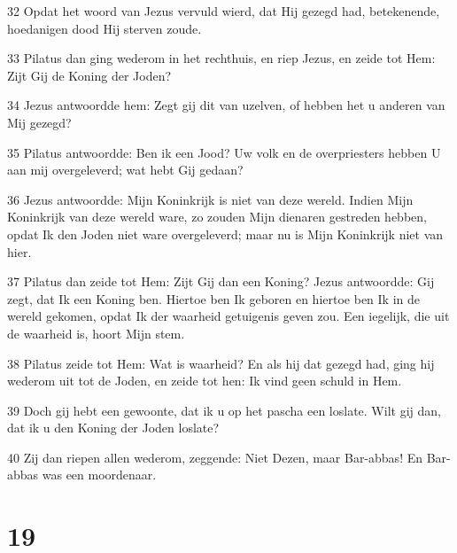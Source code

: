 \par 32 Opdat het woord van Jezus vervuld wierd, dat Hij gezegd had, betekenende, hoedanigen dood Hij sterven zoude.
\par 33 Pilatus dan ging wederom in het rechthuis, en riep Jezus, en zeide tot Hem: Zijt Gij de Koning der Joden?
\par 34 Jezus antwoordde hem: Zegt gij dit van uzelven, of hebben het u anderen van Mij gezegd?
\par 35 Pilatus antwoordde: Ben ik een Jood? Uw volk en de overpriesters hebben U aan mij overgeleverd; wat hebt Gij gedaan?
\par 36 Jezus antwoordde: Mijn Koninkrijk is niet van deze wereld. Indien Mijn Koninkrijk van deze wereld ware, zo zouden Mijn dienaren gestreden hebben, opdat Ik den Joden niet ware overgeleverd; maar nu is Mijn Koninkrijk niet van hier.
\par 37 Pilatus dan zeide tot Hem: Zijt Gij dan een Koning? Jezus antwoordde: Gij zegt, dat Ik een Koning ben. Hiertoe ben Ik geboren en hiertoe ben Ik in de wereld gekomen, opdat Ik der waarheid getuigenis geven zou. Een iegelijk, die uit de waarheid is, hoort Mijn stem.
\par 38 Pilatus zeide tot Hem: Wat is waarheid? En als hij dat gezegd had, ging hij wederom uit tot de Joden, en zeide tot hen: Ik vind geen schuld in Hem.
\par 39 Doch gij hebt een gewoonte, dat ik u op het pascha een loslate. Wilt gij dan, dat ik u den Koning der Joden loslate?
\par 40 Zij dan riepen allen wederom, zeggende: Niet Dezen, maar Bar-abbas! En Bar-abbas was een moordenaar.

\chapter{19}

